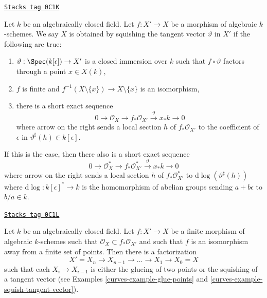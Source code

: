 \begin{example}

\label{curves-example-squish-tangent-vector}
\href{https://stacks.math.columbia.edu/tag/0C1K}{\texttt{Stacks tag 0C1K}}

Let $k$ be an algebraically closed field. Let $f : X' \to X$
be a morphism of algebraic $k$-schemes. We say $X$ is
obtained by squishing the tangent vector $\vartheta$ in $X'$
if the following are true:
\begin{enumerate}
\item $\vartheta : \Spec(k[\epsilon]) \to X'$ is a closed immersion
over $k$ such that $f \circ \vartheta$ factors through a point $x \in X(k)$,
\item $f$ is finite and
$f^{-1}(X \setminus \{x\}) \to X \setminus \{x\}$ is an isomorphism,
\item there is a short exact sequence
$$
0 \to \mathcal{O}_X \to f_*\mathcal{O}_{X'} \xrightarrow{\vartheta} x_*k \to 0
$$
where arrow on the right sends a local section $h$ of $f_*\mathcal{O}_{X'}$
to the coefficient of $\epsilon$ in $\vartheta^\sharp(h) \in k[\epsilon]$.
\end{enumerate}
If this is the case, then there also is a short exact sequence
$$
0 \to \mathcal{O}_X^* \to f_*\mathcal{O}_{X'}^*
\xrightarrow{\vartheta} x_*k \to 0
$$
where arrow on the right sends a local section $h$ of $f_*\mathcal{O}_{X'}^*$
to $\text{d}\log(\vartheta^\sharp(h))$ where
$\text{d}\log : k[\epsilon]^* \to k$
is the homomorphism of abelian groups sending $a + b\epsilon$ to $b/a \in k$.
\end{example}

\begin{lemma}
\label{curves-lemma-factor-almost-isomorphism}
\href{https://stacks.math.columbia.edu/tag/0C1L}{\texttt{Stacks tag 0C1L}}

Let $k$ be an algebraically closed field. Let $f : X' \to X$ be a
finite morphism of algebraic $k$-schemes such that
$\mathcal{O}_X \subset f_*\mathcal{O}_{X'}$ and such that $f$ is an
isomorphism away from a finite set of points. Then there is a factorization
$$
X' = X_n \to X_{n - 1} \to \ldots \to X_1 \to X_0 = X
$$
such that each $X_i \to X_{i - 1}$ is either the glueing of
two points or the squishing of a tangent vector
(see Examples \ref{curves-example-glue-points} and
\ref{curves-example-squish-tangent-vector}).
\end{lemma}

